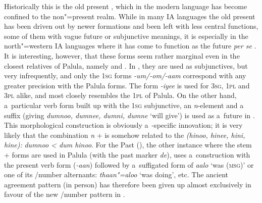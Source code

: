 Historically this is the old present , which in the modern language has become confined to the non"=present  realm. While in many IA languages the old present has been driven out by newer formations and been left with less central functions, some of them with vague future or subjunctive meanings, it is especially in the north"=western IA languages where it has come to function as the future \textit{per se} \citep[288]{masica1991}. It is interesting, however, that these forms seem rather marginal even in the closest relatives of Palula, namely \iliSauji and \iliKalkoti. In \iliSauji, they are used as subjunctives, but very infrequently, and only the \textsc{1sg} forms \textit{-um/-om/-aam} correspond with any greater precision with the Palula forms. The form \textit{-iyee} is used for \textsc{3sg}, \textsc{1pl} and \textsc{3pl} alike, and most closely resembles the \textsc{1pl} of Palula. On the other hand, a~particular verb form built up with the \textsc{1sg} subjunctive, an \textit{n}-element and a~ suffix (giving \textit{dumnoo, dumnee, dumni, dumne} `will give') is used as a~future in \iliSauji. This morphological construction is obviously a~\iliSauji-specific innovation; it is very likely that the combination \textit{n} +  is somehow related to the  \textit{(hinoo, hinee, hini, hine):} \textit{dumnoo {\textless} dum hinoo}. For the Past  (), the other instance where the  stem +  forms are used in Palula (with the past  marker \textit{de}), \iliSauji uses a~construction with the present  verb form (\textit{-aan}) followed by a~suffigated form of \textit{aalo} `was \textsc{(msg)}' or one of its /number alternants: \textit{thaan"=aloo} `was doing', etc. The ancient agreement pattern (in person) has therefore been given up almost exclusively in favour of the new /number pattern in \iliSauji \citep[46--54]{buddruss1967}.


